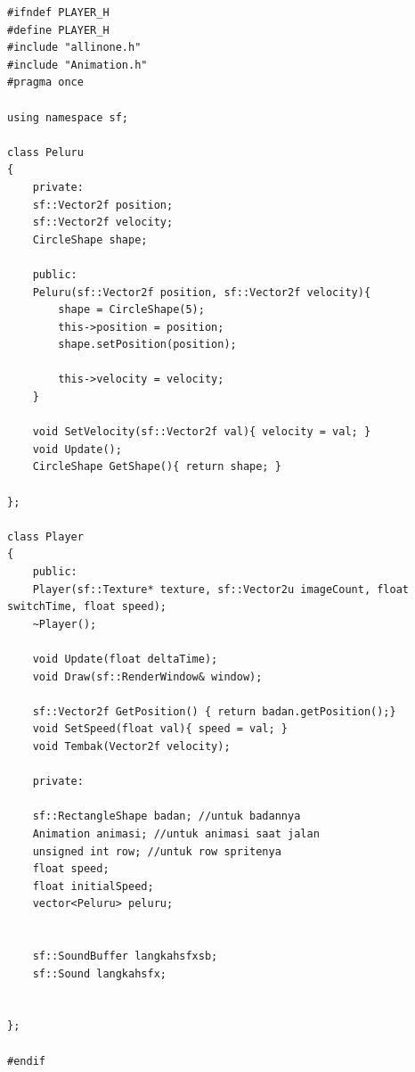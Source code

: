 \documentclass[oneside, a4paper ,12pt]{book}
\begin{document}
\begin{verbatim}
#ifndef PLAYER_H
#define PLAYER_H
#include "allinone.h"
#include "Animation.h"
#pragma once

using namespace sf;

class Peluru
{
	private:
	sf::Vector2f position;
	sf::Vector2f velocity;
	CircleShape shape;
	
	public:
	Peluru(sf::Vector2f position, sf::Vector2f velocity){
		shape = CircleShape(5);
		this->position = position;
		shape.setPosition(position);
		
		this->velocity = velocity;
	}
	
	void SetVelocity(sf::Vector2f val){ velocity = val; }
	void Update();
	CircleShape GetShape(){ return shape; }
	
};

class Player
{
	public:
	Player(sf::Texture* texture, sf::Vector2u imageCount, float switchTime, float speed);
	~Player();
	
	void Update(float deltaTime);
	void Draw(sf::RenderWindow& window);
	
	sf::Vector2f GetPosition() { return badan.getPosition();}
	void SetSpeed(float val){ speed = val; }
	void Tembak(Vector2f velocity);
	
	private:
	
	sf::RectangleShape badan; //untuk badannya
	Animation animasi; //untuk animasi saat jalan
	unsigned int row; //untuk row spritenya
	float speed;
	float initialSpeed;
	vector<Peluru> peluru;
	
	
	sf::SoundBuffer langkahsfxsb;
	sf::Sound langkahsfx;
	
	
};

#endif
\end{verbatim}
\end{document}
